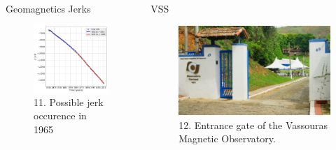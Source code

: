 \documentclass[final,t]{beamer}
\begin{document}
\begin{columns}[t]
\begin{column}{.25\linewidth}
\begin{block}{Geomagnetics Jerks}
		
		\begin{figure}
			\centering
			\includegraphics[scale=0.8]{"figs_ed/Linear regression Z_v3"}
			\caption{\small 11. Possible jerk occurence in 1965}
			\label{fig:g_Sintetico}
		\end{figure}
		
		
	\end{block}
\end{column}



\begin{column}{.25\linewidth}



\begin{block}{VSS}
	\justifying
\begin{figure}
\centering
\includegraphics[width=0.9\linewidth]{OMV_JOELSONMOREIRA}
\caption{12. Entrance gate of the Vassouras Magnetic Observatory.}
\label{fig:OMV_JOELSONMOREIRA}
\end{figure}






\end{block}
\end{column}
\end{columns}
\end{document}
